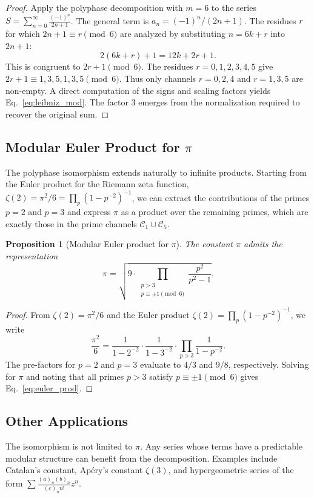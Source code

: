 \documentclass{mcom-l} %
\theoremstyle{plain} %
\newtheorem{proposition}[theorem]{Proposition}
\theoremstyle{definition} %
\theoremstyle{remark} %
\begin{document}
\begin{proof}
Apply the polyphase decomposition with \(m=6\) to the series \(S = \sum_{n=0}^{\infty} \frac{(-1)^n}{2n+1}\). The general term is \(a_n = (-1)^n / (2n+1)\). The residues \(r\) for which \(2n+1 \equiv r \pmod{6}\) are analyzed by substituting \(n = 6k + r\) into \(2n+1\):
\[
2(6k+r)+1 = 12k + 2r + 1.
\]
This is congruent to \(2r+1 \pmod{6}\). The residues \(r=0,1,2,3,4,5\) give \(2r+1 \equiv 1,3,5,1,3,5 \pmod{6}\). Thus only channels \(r=0,2,4\) and \(r=1,3,5\) are non-empty. A direct computation of the signs and scaling factors yields Eq.~\eqref{eq:leibniz_mod}. The factor 3 emerges from the normalization required to recover the original sum.
\end{proof}

\subsection{Modular Euler Product for \(\pi\)}
The polyphase isomorphism extends naturally to infinite products. Starting from the Euler product for the Riemann zeta function, \(\zeta(2) = \pi^2/6 = \prod_p (1 - p^{-2})^{-1}\), we can extract the contributions of the primes \(p=2\) and \(p=3\) and express \(\pi\) as a product over the remaining primes, which are exactly those in the prime channels \(\mathcal{C}_1 \cup \mathcal{C}_5\).

\begin{proposition}[Modular Euler product for \(\pi\)]
\label{prop:euler}
The constant \(\pi\) admits the representation
\begin{equation}
\pi = \sqrt{9 \cdot \prod_{\substack{p > 3 \\ p \equiv \pm 1 \pmod{6}}} \frac{p^2}{p^2 - 1}}.
\label{eq:euler_prod}
\end{equation}
\end{proposition}

\begin{proof}
From \(\zeta(2) = \pi^2/6\) and the Euler product \(\zeta(2) = \prod_p (1 - p^{-2})^{-1}\), we write
\[
\frac{\pi^2}{6} = \frac{1}{1 - 2^{-2}} \cdot \frac{1}{1 - 3^{-2}} \cdot \prod_{p > 3} \frac{1}{1 - p^{-2}}.
\]
The pre-factors for \(p=2\) and \(p=3\) evaluate to \(4/3\) and \(9/8\), respectively. Solving for \(\pi\) and noting that all primes \(p>3\) satisfy \(p \equiv \pm 1 \pmod{6}\) gives Eq.~\eqref{eq:euler_prod}.
\end{proof}

\subsection{Other Applications}
The isomorphism is not limited to \(\pi\). Any series whose terms have a predictable modular structure can benefit from the decomposition. Examples include Catalan's constant, Apéry's constant \(\zeta(3)\), and hypergeometric series of the form \(\sum \frac{(a)_n (b)_n}{(c)_n n!} z^n\).
\end{document}
